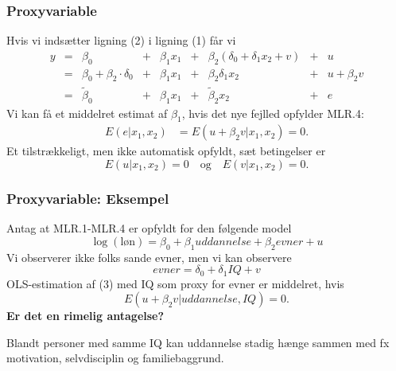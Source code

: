 \documentclass[aspectratio=43,t]{beamer}
\begin{document}

\begin{frame}
\frametitle{Proxyvariable}
	
	Hvis vi indsætter ligning (2) i ligning (1) får vi
	\begin{align*}
	y &=& \beta_0                         &+& \beta_1 x_1 &+& \beta_2 (\delta_0 + \delta_1 x_2 + v) &+& u \\
	  &=& \beta_0+ \beta_2 \cdot \delta_0 &+& \beta_1 x_1 &+& \beta_2 \delta_1 x_2                  &+& u + \beta_2v \\
	  &=& \tilde{\beta}_0                 &+& \beta_1 x_1 &+& \tilde{\beta}_2 x_2                   &+& e
	\end{align*}
	Vi kan få et middelret estimat af $\beta_1$, hvis det nye fejlled opfylder MLR.4:
	\begin{align*}
	E(e|x_1,x_2)&=E(u+\beta_2v|x_1,x_2)=0.
	\end{align*}	
	Et tilstrækkeligt, men ikke automatisk opfyldt, sæt betingelser er
	\begin{equation*}
	E(u|x_1,x_2)=0
	\quad\text{og}\quad
	E(v|x_1,x_2)=0.
	\end{equation*}
\end{frame}


\begin{frame}
\frametitle{Proxyvariable: Eksempel}
	
	Antag at MLR.1-MLR.4 er opfyldt for den følgende model
	\begin{equation}
		\log(\text{løn}) = \beta_0 + \beta_1 uddannelse + \beta_2 evner + u
	\end{equation}
	Vi observerer ikke folks sande evner, men vi kan observere
	\begin{equation}
		evner = \delta_0 + \delta_1 IQ + v
	\end{equation}
	OLS-estimation af (3) med IQ som proxy for evner er middelret, hvis
	\begin{equation}
		E(u+\beta_2v|uddannelse,IQ) = 0.
	\end{equation}	
	\textbf{Er det en rimelig antagelse?}

	Blandt personer med samme IQ kan uddannelse stadig hænge sammen med fx motivation, selvdisciplin og familiebaggrund.
	
\end{frame}
\end{document}
